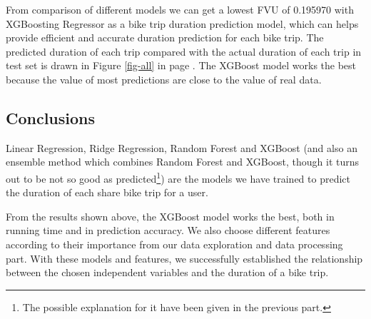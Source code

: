 \par From comparison of different models we can get a lowest FVU of 0.195970 with XGBoosting Regressor as a bike trip duration prediction model, which can helps provide efficient and accurate duration prediction for each bike trip. The predicted duration of each trip compared with the actual duration of each trip in test set is drawn in Figure \ref{fig-all} in page \pageref{fig-all}. The XGBoost model works the best because the value of most predictions are close to the value of real data.

\subsection{Conclusions}
Linear Regression, Ridge Regression, Random Forest and XGBoost (and also an ensemble method which combines Random Forest and XGBoost, though it turns out to be not so good as predicted\footnote{The possible explanation for it have been given in the previous part.}) are the models we have trained to predict the duration of each share bike trip for a user.  

\par From the results shown above, the XGBoost model works the best, both in running time and in prediction accuracy. We also choose different features according to their importance from our data exploration and data processing part. With these models and features, we successfully established the relationship between the chosen independent variables and the duration of a bike trip. 

